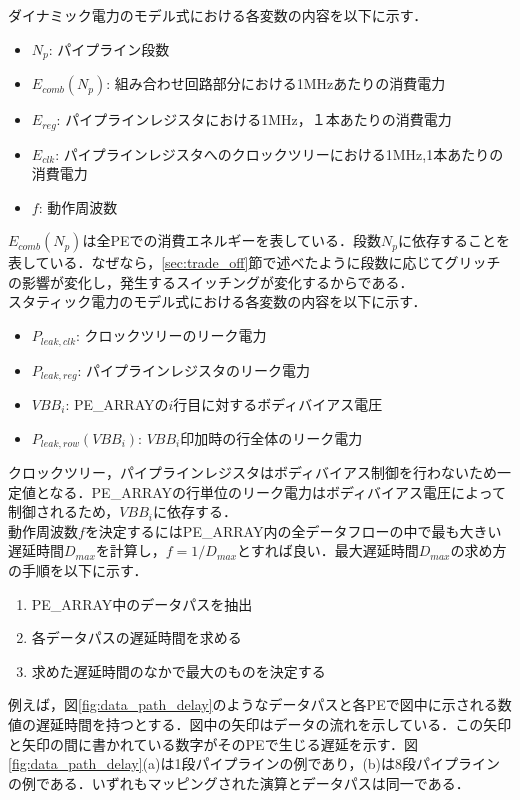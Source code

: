 {ダイナミック電力のモデル式における各変数の内容を以下に示す．
\begin{itemize}
\item $N_p$: パイプライン段数
\item $E_{comb}(N_p)$: 組み合わせ回路部分における1MHzあたりの消費電力
\item $E_{reg}$: パイプラインレジスタにおける1MHz，１本あたりの消費電力
\item $E_{clk}$: パイプラインレジスタへのクロックツリーにおける1MHz,1本あたりの消費電力
\item $f$: 動作周波数
\end{itemize}

$E_{comb}(N_p)$は全PEでの消費エネルギーを表している．段数$N_p$に依存することを表している．なぜなら，\ref{sec:trade_off}節で述べたように段数に応じてグリッチの影響が変化し，発生するスイッチングが変化するからである．\\

スタティック電力のモデル式における各変数の内容を以下に示す．
\begin{itemize}
\item $P_{leak,clk}$: クロックツリーのリーク電力
\item $P_{leak,reg}$: パイプラインレジスタのリーク電力
\item $VBB_i$: PE\_ARRAYの$i$行目に対するボディバイアス電圧
\item $P_{leak,row}(VBB_i)$: $VBB_i$印加時の行全体のリーク電力
\end{itemize}

クロックツリー，パイプラインレジスタはボディバイアス制御を行わないため一定値となる．PE\_ARRAYの行単位のリーク電力はボディバイアス電圧によって制御されるため，$VBB_i$に依存する．\\

動作周波数$f$を決定するにはPE\_ARRAY内の全データフローの中で最も大きい遅延時間$D_{max}$を計算し，$f = 1/D_{max}$とすれば良い．最大遅延時間$D_{max}$の求め方の手順を以下に示す．

\begin{enumerate}
\item PE\_ARRAY中のデータパスを抽出
\item 各データパスの遅延時間を求める
\item 求めた遅延時間のなかで最大のものを決定する
\end{enumerate}

例えば，図\ref{fig:data_path_delay}のようなデータパスと各PEで図中に示される数値の遅延時間を持つとする．図中の矢印はデータの流れを示している．この矢印と矢印の間に書かれている数字がそのPEで生じる遅延を示す．図\ref{fig:data_path_delay}(a)は1段パイプラインの例であり，(b)は8段パイプラインの例である．いずれもマッピングされた演算とデータパスは同一である．

}
